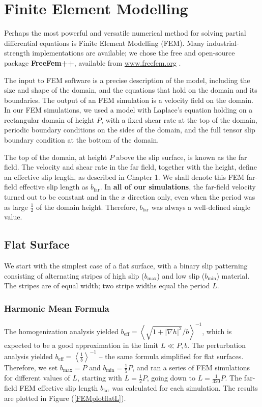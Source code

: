 \documentclass[12pt, a4paper, twoside, openright]{book}
\newcommand{\bmin}{\ensuremath{b_{\mathrm{min}}}}
\newcommand{\bmax}{\ensuremath{b_{\mathrm{max}}}}
\newcommand{\bfar}{\ensuremath{b_{\mathrm{far}}}}
\newcommand{\beffh}{\ensuremath{b_{\mathrm{eff}}} = \left< \frac{1}{b} \right>^{-1} }
\newcommand{\beffha}{\ensuremath{b_{\mathrm{eff}}} = \left< \sqrt{1 + |\nabla h|^2} / {b} \right>^{-1} }
\begin{document}
\section{Finite Element Modelling}

Perhaps the most powerful and versatile numerical method for solving partial differential equations is Finite Element Modelling (FEM).  Many industrial-strength implementations are available; we chose the free and open-source package \textbf{FreeFem++}, available from \url{www.freefem.org} \cite{freefem++}.


The input to FEM software is a precise description of the model, including the size and shape of the domain, and the equations that hold on the domain and its boundaries. The output of an FEM simulation is a velocity field on the domain.  In our FEM simulations, we used a model with Laplace's equation holding on a rectangular domain of height $P$, with a fixed shear rate at the top of the domain, periodic boundary conditions on the sides of the domain, and the full tensor slip boundary condition at the bottom of the domain.

The top of the domain, at height $P$ above the slip surface, is known as the far field.  The velocity and shear rate in the far field, together with the height, define an effective slip length, as described in Chapter 1.  We shall denote this FEM far-field effective slip length as $\bfar$.  In \textbf{all of our simulations}, the far-field velocity turned out to be constant and in the $x$ direction only, even when the period was as large $\frac{1}{2}$ of the domain height.  Therefore, $\bfar$ was always a well-defined single value.



\subsection{Flat Surface}

We start with the simplest case of a flat surface, with a binary slip patterning consisting of alternating stripes of high slip ($\bmax$) and low slip ($\bmin$) material.  The stripes are of equal width; two stripe widths equal the period $L$.

\clearpage
\subsubsection{Harmonic Mean Formula}
The homogenization analysis yielded $\beffha$, which is expected to be a good approximation in the limit $L \ll P,b$.  The perturbation analysis yielded $\beffh$ --  the same formula simplified for flat surfaces.  Therefore, we set $\bmax = P$ and $\bmin = \frac{1}{5}P$, and ran a series of FEM simulations for different values of $L$, starting with $L = \frac{1}{2}P$, going down to $L = \frac{1}{320}P$.  The far-field FEM effective slip length $\bfar$ was calculated for each simulation.  The results are plotted in Figure (\ref{FEMplotflatL}).
\end{document}
